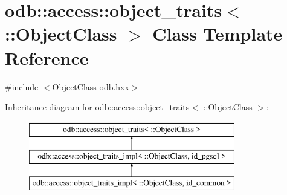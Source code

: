 \hypertarget{classodb_1_1access_1_1object__traits_3_01_1_1_object_class_01_4}{}\section{odb\+:\+:access\+:\+:object\+\_\+traits$<$ \+:\+:Object\+Class $>$ Class Template Reference}
\label{classodb_1_1access_1_1object__traits_3_01_1_1_object_class_01_4}


{\ttfamily \#include $<$Object\+Class-\/odb.\+hxx$>$}

Inheritance diagram for odb\+:\+:access\+:\+:object\+\_\+traits$<$ \+:\+:Object\+Class $>$\+:\begin{figure}[H]
\begin{center}
\leavevmode
\includegraphics[height=3.000000cm]{d0/df8/classodb_1_1access_1_1object__traits_3_01_1_1_object_class_01_4}
\end{center}
\end{figure}
